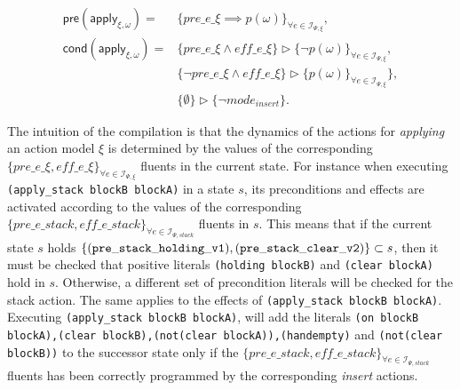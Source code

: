 \documentclass[letterpaper]{article} %
\newcommand{\pre}{\mathsf{pre}}     %
\newcommand{\cond}{\mathsf{cond}}   %
\begin{document}
\begin{small}
\begin{align*}
\pre(\mathsf{apply_{\xi,\omega}})=&\{pre\_e\_\xi\implies p(\omega)\}_{\forall e\in{\mathcal I}_{\Psi,\xi}},\\
\cond(\mathsf{apply_{\xi,\omega}})=&\{pre\_e\_\xi\wedge eff\_e\_\xi\}\rhd\{\neg p(\omega)\}_{\forall e\in{\mathcal I}_{\Psi,\xi}},\\
&\{\neg pre\_e\_\xi \wedge eff\_e\_\xi\}\rhd\{p(\omega)\}_{\forall e\in{\mathcal I}_{\Psi,\xi}}\},\\
&\{\emptyset\}\rhd\{\neg mode_{insert}\}.
\end{align*}
\end{small}

The intuition of the compilation is that the dynamics of the actions for {\em applying} an action model $\xi$ is determined by the values of the corresponding $\{pre\_e\_\xi, eff\_e\_\xi\}_{\forall e\in{\mathcal I}_{\Psi,\xi}}$ fluents in the current state. For instance when executing {\tt{\small (apply\_stack blockB blockA)}} in a state $s$, its preconditions and effects are activated according to the values of the corresponding $\{pre\_e\_stack, eff\_e\_stack\}_{\forall e\in{\mathcal I}_{\Psi,stack}}$ fluents in $s$. This means that if the current state $s$ holds $\{{\tt\scriptsize (pre\_stack\_holding\_v1),(pre\_stack\_clear\_v2)}\} \subset s$, then it must be checked that positive literals {\tt{\small (holding blockB)}} and {\tt{\small (clear blockA)}} hold in $s$. Otherwise, a different set of precondition literals will be checked for the stack action. The same applies to the effects of {\tt{\small (apply\_stack blockB blockA)}}. Executing {\tt{\small (apply\_stack blockB blockA)}}, will add the literals {\tt{\small (on blockB blockA),(clear blockB),(not(clear blockA)),(handempty)}} and {\tt{\small(not(clear blockB))}} to the successor state only if the $\{pre\_e\_stack, eff\_e\_stack\}_{\forall e\in{\mathcal I}_{\Psi,stack}}$ fluents has been correctly programmed by the corresponding {\em insert} actions.
\end{document}

